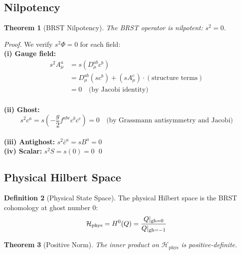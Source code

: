 \documentclass[11pt,a4paper]{article}
\providecommand{\Hilbert}{\mathcal{H}}
\let\im\relax
\let\ke\relax
\DeclareMathOperator{\im}{im}
\DeclareMathOperator{\ke}{ker}
\theoremstyle{plain}
\newtheorem{theorem}{Theorem}[section]
\theoremstyle{definition}
\newtheorem{definition}[theorem]{Definition}
\begin{document}
\subsection{Nilpotency}

\begin{theorem}[BRST Nilpotency]
\label{thm:nilpotency}
The BRST operator is nilpotent: $s^2 = 0$.
\end{theorem}

\begin{proof}
We verify $s^2\Phi = 0$ for each field:
\vspace{0.3em}\\
\textbf{(i) Gauge field:}
\begin{align}
s^2 A^a_\mu &= s(D_\mu^{ab} c^b) \\
&= D_\mu^{ab}(s c^b) + (s A^c_\mu) \cdot (\text{structure terms}) \\
&= 0 \quad \text{(by Jacobi identity)}
\end{align}
\vspace{0.3em}\\
\textbf{(ii) Ghost:}
\begin{equation}
s^2 c^a = s\left(-\frac{g}{2}f^{abc}c^b c^c\right) = 0
\quad \text{(by Grassmann antisymmetry and Jacobi)}
\end{equation}
\\
\textbf{(iii) Antighost:} $s^2\bar{c}^a = s B^a = 0$
\vspace{0.3em} \\
\textbf{(iv) Scalar:} $s^2 S = s(0) = 0$
\qed
\end{proof}

\subsection{Physical Hilbert Space}

\begin{definition}[Physical State Space]
The physical Hilbert space is the BRST cohomology at ghost number 0:
\begin{equation}
\Hilbert_{\mathrm{phys}} = H^0(Q) = \frac{\ke Q|_{\mathrm{gh}=0}}{\im Q|_{\mathrm{gh}=-1}}
\label{eq:physical_hilbert}
\end{equation}
\end{definition}
\vspace{0.3em}
\begin{theorem}[Positive Norm]
\label{thm:positive_norm}
The inner product on $\Hilbert_{\mathrm{phys}}$ is positive-definite.
\end{theorem}
\end{document}
